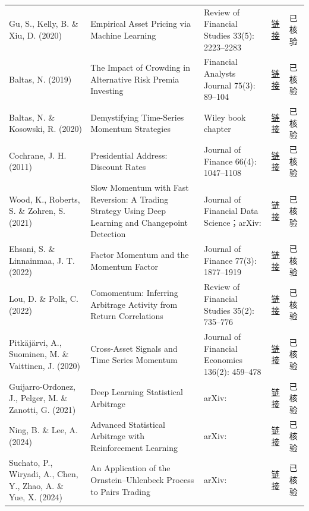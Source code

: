 \begin{longtable}{@{}>{\raggedright\arraybackslash}p{2.55cm}>{\raggedright\arraybackslash}p{4.7cm}>{\raggedright\arraybackslash}p{2.7cm}>{\raggedright\arraybackslash}p{1.9cm}>{\raggedright\arraybackslash}p{1.45cm}@{}}
Gu, S., Kelly, B. \& Xiu, D. (2020) & Empirical Asset Pricing via Machine Learning & Review of Financial Studies 33(5): 2223--2283 & \href{https://doi.org/10.1093/rfs/hhaa009}{链接} & 已核验 \\
Baltas, N. (2019) & The Impact of Crowding in Alternative Risk Premia Investing & Financial Analysts Journal 75(3): 89--104 & \href{https://doi.org/10.1080/0015198x.2019.1600955}{链接} & 已核验 \\
Baltas, N. \& Kosowski, R. (2020) & Demystifying Time-Series Momentum Strategies & Wiley book chapter & \href{https://doi.org/10.1002/9781119599364.ch3}{链接} & 已核验 \\
Cochrane, J. H. (2011) & Presidential Address: Discount Rates & Journal of Finance 66(4): 1047--1108 & \href{https://doi.org/10.1111/j.1540-6261.2011.01671.x}{链接} & 已核验 \\
Wood, K., Roberts, S. \& Zohren, S. (2021) & Slow Momentum with Fast Reversion: A Trading Strategy Using Deep Learning and Changepoint Detection & Journal of Financial Data Science；arXiv:\allowbreak 2105.13727 & \href{https://arxiv.org/abs/2105.13727}{链接} & 已核验 \\
Ehsani, S. \& Linnainmaa, J. T. (2022) & Factor Momentum and the Momentum Factor & Journal of Finance 77(3): 1877--1919 & \href{https://doi.org/10.1111/jofi.13131}{链接} & 已核验 \\
Lou, D. \& Polk, C. (2022) & Comomentum: Inferring Arbitrage Activity from Return Correlations & Review of Financial Studies 35(2): 735--776 & \href{https://doi.org/10.1093/rfs/hhab117}{链接} & 已核验 \\
Pitkäjärvi, A., Suominen, M. \& Vaittinen, J. (2020) & Cross-Asset Signals and Time Series Momentum & Journal of Financial Economics 136(2): 459--478 & \href{https://doi.org/10.1016/j.jfineco.2019.02.011}{链接} & 已核验 \\
Guijarro-Ordonez, J., Pelger, M. \& Zanotti, G. (2021) & Deep Learning Statistical Arbitrage & arXiv:\allowbreak 2106.04028 & \href{https://arxiv.org/abs/2106.04028}{链接} & 已核验 \\
Ning, B. \& Lee, A. (2024) & Advanced Statistical Arbitrage with Reinforcement Learning & arXiv:\allowbreak 2403.12180 & \href{https://arxiv.org/abs/2403.12180}{链接} & 已核验 \\
Suchato, P., Wiryadi, A., Chen, Y., Zhao, A. \& Yue, X. (2024) & An Application of the Ornstein--Uhlenbeck Process to Pairs Trading & arXiv:\allowbreak 2412.12458 & \href{https://arxiv.org/abs/2412.12458}{链接} & 已核验 \\

\end{longtable}
